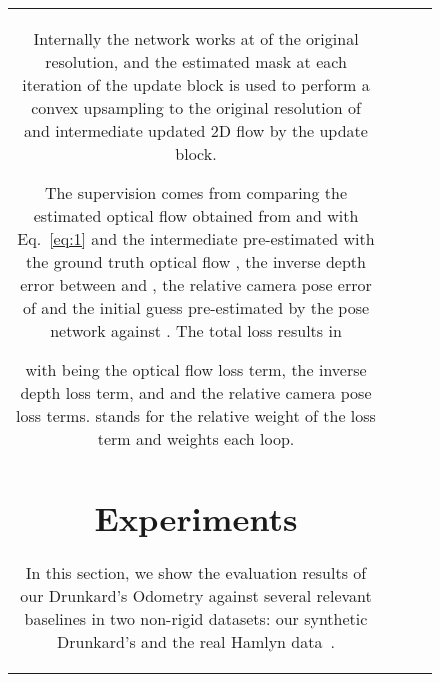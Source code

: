 \documentclass{article}
\begin{document}
\begin{figure}
\begin{tabular}{cccc}
Internally the network works at  of the original resolution, and the estimated mask at each iteration of the update block is used to perform a convex upsampling to the original resolution of  and intermediate updated 2D flow  by the update block. 

The supervision comes from comparing the estimated optical flow  obtained from   and  with Eq.~\ref{eq:1} and the intermediate pre-estimated  with the ground truth optical flow , the inverse depth error between  and , the relative camera pose error of  and the initial guess pre-estimated by the pose network  against . The total loss results in

with  being the optical flow loss term,  the inverse depth loss term, and  and  the relative camera pose loss terms.  stands for the relative weight of the  loss term and  weights each loop.



\section{Experiments}  \label{sec:experiments}
In this section, we show the evaluation results of our Drunkard's Odometry against several relevant baselines in two non-rigid datasets: our synthetic Drunkard's and the real Hamlyn data~\cite{mountney2010three,stoyanov2005soft,stoyanov2010real,pratt2010dynamic}.


\end{tabular}
\end{figure}
\end{document}

